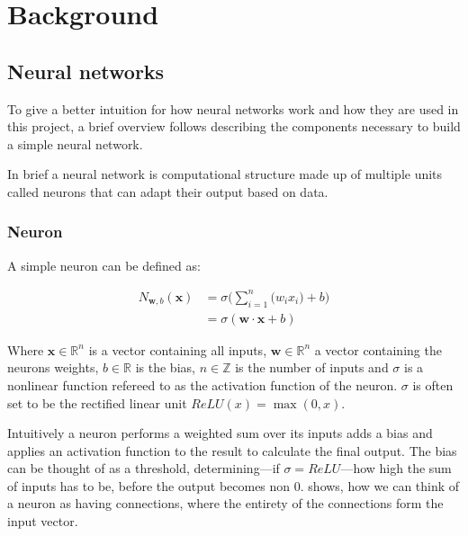 
\newcommand{\neuronSum}[1][n]{
	\sigma\Bigg(\sum_{i=1}^{#1}{\Big(w_i x_i\Big)} + b\Bigg)
}

\chapter{Background}
\section{Neural networks}
To give a better intuition for how neural networks work and how they are used in this project, a brief overview follows describing the components necessary to build a simple neural network.

In brief a neural network is computational structure made up of multiple units called neurons that can adapt their output based on data.


\subsection{Neuron}
A simple neuron can be defined as:

\begin{equation}
\begin{split}
	N_{\bm w, b}(\bm{x}) & = \neuronSum[n] \\
 	& = \sigma (\bm{w} \cdot \bm{x} + b)
\end{split}
\end{equation}

Where $\bm{x} \in \mathbb{R}^n$ is a vector containing all inputs, $ \bm{w} \in \mathbb{R}^n$ a vector containing the neurons weights, $b \in \mathbb{R}$ is the bias, $n \in \mathbb{Z}$ is the number of inputs and $\sigma$ is a nonlinear function refereed to as the activation function of the neuron. $\sigma$ is often set to be the rectified linear unit $ReLU(x) = \max(0, x)$.

Intuitively a neuron performs a weighted sum over its inputs adds a bias and applies an activation function to the result to calculate the final output. The bias can be thought of as a threshold, determining---if $\sigma = ReLU$---how high the sum of inputs has to be, before the output becomes non 0.  shows, how we can think of a neuron as having connections, where the entirety of the connections form the input vector.

\neuronGraph{p}{$\displaystyle{\neuronSum[3]}$}


